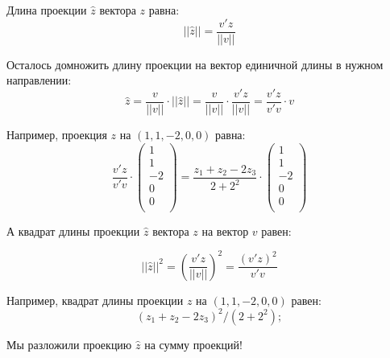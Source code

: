 \documentclass[11pt,russian,]{article}
\newcommand{\1}{\mathbbm{1}}
\begin{document}
Длина проекции \(\hat z\) вектора \(z\) равна: \[
||\hat z|| = \frac{v'z}{||v||}
\]

Осталось домножить длину проекции на вектор единичной длины в нужном
направлении: \[
\hat z = \frac{v}{||v||} \cdot ||\hat z|| = \frac{v}{||v||} \cdot \frac{v'z}{||v||} =  \frac{v'z}{v'v} \cdot v
\]

Например, проекция \(z\) на \((1, 1, -2, 0, 0)\) равна: \[
\frac{v'z}{v'v} \cdot \begin{pmatrix}
1 \\
1 \\
-2 \\
0 \\
0 \\
\end{pmatrix} =
\frac{z_1 + z_2 - 2z_3}{2+2^2} \cdot \begin{pmatrix}
1 \\
1 \\
-2 \\
0 \\
0 \\
\end{pmatrix}
\]

А квадрат длины проекции \(\hat z\) вектора \(z\) на вектор \(v\) равен:

\[
||\hat z||^2 = \left(\frac{v'z}{||v||}\right)^2 = \frac{(v'z)^2}{v'v}
\]

Например, квадрат длины проекции \(z\) на \((1, 1, -2, 0, 0)\) равен: \[
(z_1 + z_2 - 2z_3)^2/(2+2^2);
\]

Мы разложили проекцию \(\hat z\) на сумму проекций!
\end{document}
